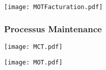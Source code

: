                     \texttt{[image: MOTFacturation.pdf]}


                \subsubsection{Processus Maintenance}
                    \texttt{[image: MCT.pdf]}


                    \texttt{[image: MOT.pdf]}

